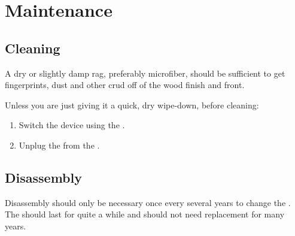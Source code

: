 \part{Maintenance} \label{Maintenance}

\chapter{Cleaning} \label{Cleaning}

A dry or slightly damp rag, preferably microfiber, should be sufficient to get
fingerprints, dust and other crud off of the wood finish and \front{} front.

\par\bigskip


\par\bigskip

Unless you are just giving it a quick, dry wipe-down, before cleaning:
\begin{enumerate}
  \item Switch the device  using the \hyperref[Power Switch]{}.
  \item Unplug the \hyperref[Power Adapter]{} from the
    \hyperref[Power Port]{}.
\end{enumerate}

\chapter{Disassembly} \label{Disassembly}

Disassembly should only be necessary once every several years to change the
.  The  should last for quite a while and should not need
replacement for many years.

